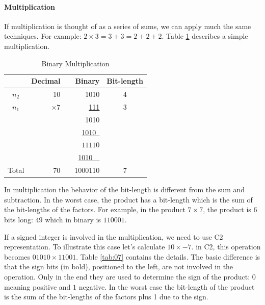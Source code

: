 \documentclass[10pt]{article}
\begin{document}
\paragraph{Multiplication}
If multiplication is thought of as a series of sums, we can apply much the same
techniques. For example: $2 \times 3 = 3 + 3 = 2 + 2 + 2$. Table \ref{tab:06}
describes a simple multiplication.

\begin{table}[ht]
  \centering
  \caption{Binary Multiplication}
  \begin{tabular}{crrrc}
  \hline
	& Decimal & & Binary & Bit-length \\
  \hline      
  $n_2$ & 10	& & 1010 & 4\\
  $n_1$ & \underline{$\times 7$} & & \underline{111} & 3 \\
  & & & 1010  & \\
  & & & \underline{1010\ } & \\
  & & & $11110$ & \\
  & & & \underline{1010\ \ } & \\
  Total& 70 & & 1000110 & 7\\
  \hline
      \end{tabular}
  \label{tab:06}
\end{table}

In multiplication the behavior of the bit-length is different from the sum and
subtraction. In the worst case, the product has a bit-length which is the sum of
the bit-lengths of the factors. For example, in the product $7\times7$, the
product is 6 bits long: $49$ which in binary is $110001$.

If a signed integer is involved in the multiplication, we need to use C2
representation. To illustrate this case let's calculate $10\times-7$. in C2,
this operation becomes $01010\times11001$. Table \ref{tab:07} contains the
details. The basic difference is that the sign bits (in bold), positioned to
the left, are not involved in the operation. Only in the end they are used to
determine the sign of the product: $0$ meaning positive and $1$ negative. In
the worst case the bit-length of the product is the sum of the bit-lengths of
the factors plus 1 due to the sign.
\end{document}
